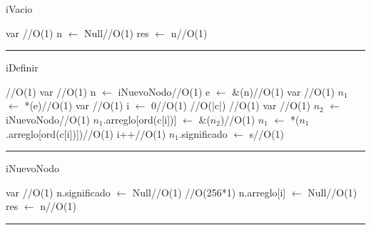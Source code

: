 \begin{algorithm}[H]
\caption{iVacio}
\begin{algorithmic}[1]
\State var \hfill //O(1)
\State n $\gets$ Null\hfill //O(1)
\State res $\gets$ n\hfill //O(1)
\EndFunction 
\end{algorithmic}
\hrule
{}
\end{algorithm}

\begin{algorithm}[H]
\caption{iDefinir}
\begin{algorithmic}[1]
\hfill //O(1)
\state var \hfill //O(1)
\state n $\gets$ iNuevoNodo\hfill //O(1)
\state e $\gets$ \&(n)\hfill //O(1)
\EndIf
\State var \hfill //O(1)
\State $n_1$ $\gets$ *(e)\hfill //O(1)
\state var \hfill //O(1)
\state i $\gets$ 0\hfill //O(1)
\hfill //O(|c|)
\hfill //O(1)
\State var \hfill //O(1)
\state $n_2$ $\gets$ iNuevoNodo\hfill //O(1)
\state $n_1$.arreglo[ord(c[i])] $\gets$ \&($n_2$)\hfill //O(1) 
\EndIf
\state $n_1$ $\gets$ *($n_1$.arreglo[ord(c[i])])\hfill //O(1)
\state i++\hfill //O(1)
\EndWhile
\state $n_1$.significado $\gets$ s\hfill //O(1)
\EndFunction 
\end{algorithmic}
\hrule
{}
\end{algorithm}


\begin{algorithm}[H]
\caption{iNuevoNodo}
\begin{algorithmic}[1]
\State var \hfill //O(1)
\State n.significado $\gets$ Null\hfill //O(1)
\hfill //O(256*1)
\State n.arreglo[i] $\gets$ Null\hfill //O(1)
\EndFor
\State res $\gets$ n\hfill //O(1)
\EndFunction 
\end{algorithmic}
\hrule
{}
\end{algorithm}




